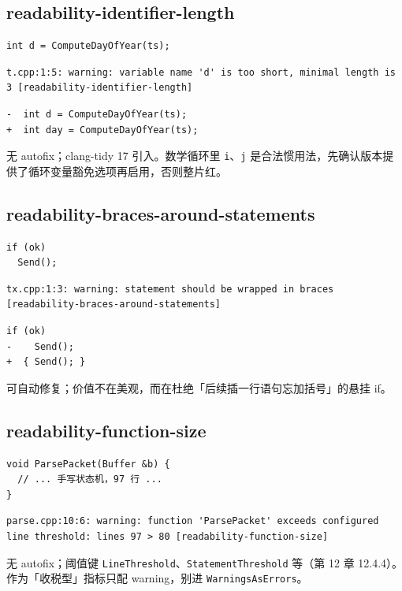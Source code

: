 \documentclass[12pt,a4paper,fontset=fandol]{ctexbook}
\begin{document}
\subsection{readability-identifier-length}\label{sec:ch13-s4b}
\begin{lstlisting}[style=cppstyle]
int d = ComputeDayOfYear(ts);
\end{lstlisting}
\begin{lstlisting}[style=shellstyle]
t.cpp:1:5: warning: variable name 'd' is too short, minimal length is 3 [readability-identifier-length]
\end{lstlisting}
\begin{lstlisting}[style=diffstyle]
-  int d = ComputeDayOfYear(ts);
+  int day = ComputeDayOfYear(ts);
\end{lstlisting}
无 autofix；clang-tidy 17 引入。数学循环里 \texttt{i}、\texttt{j} 是合法惯用法，先确认版本提供了循环变量豁免选项再启用，否则整片红。
\subsection{readability-braces-around-statements}\label{sec:ch13-s4c}
\begin{lstlisting}[style=cppstyle]
if (ok)
  Send();
\end{lstlisting}
\begin{lstlisting}[style=shellstyle]
tx.cpp:1:3: warning: statement should be wrapped in braces [readability-braces-around-statements]
\end{lstlisting}
\begin{lstlisting}[style=diffstyle]
   if (ok)
-    Send();
+  { Send(); }
\end{lstlisting}
可自动修复；价值不在美观，而在杜绝「后续插一行语句忘加括号」的悬挂 if。
\subsection{readability-function-size}\label{sec:ch13-s4d}
\begin{lstlisting}[style=cppstyle]
void ParsePacket(Buffer &b) {
  // ... 手写状态机，97 行 ...
}
\end{lstlisting}
\begin{lstlisting}[style=shellstyle]
parse.cpp:10:6: warning: function 'ParsePacket' exceeds configured line threshold: lines 97 > 80 [readability-function-size]
\end{lstlisting}
无 autofix；阈值键 \texttt{LineThreshold}、\texttt{StatementThreshold} 等（第 12 章 12.4.4）。作为「收税型」指标只配 warning，别进 \texttt{WarningsAsErrors}。
\end{document}
